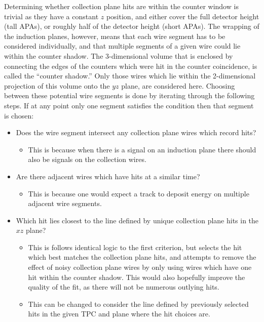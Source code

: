 Determining whether collection plane hits are within the counter window is trivial as they have a constant $z$ position, and either cover the full detector height (tall APAs), or roughly half of the detector height (short APAs). The wrapping of the induction planes, however, means that each wire segment has to be considered individually, and that multiple segments of a given wire could lie within the counter shadow. The 3-dimensional volume that is enclosed by connecting the edges of the counters which were hit in the counter coincidence, is called the ``counter shadow.'' Only those wires which lie within the 2-dimensional projection of this volume onto the $yz$ plane, are considered here. Choosing between these potential wire segments is done by iterating through the following steps. If at any point only one segment satisfies the condition then that segment is chosen:
\begin{itemize}
\item Does the wire segment intersect any collection plane wires which record hits?
  \begin{itemize}
  \item This is because when there is a signal on an induction plane there should also be signals on the collection wires.
  \end{itemize}
\item Are there adjacent wires which have hits at a similar time?
  \begin{itemize}
  \item This is because one would expect a track to deposit energy on multiple adjacent wire segments. 
  \end{itemize}
\item Which hit lies closest to the line defined by unique collection plane hits in the $xz$ plane?
  \begin{itemize}
  \item This is follows identical logic to the first criterion, but selects the hit which best matches the collection plane hits, and attempts to remove the effect of noisy collection plane wires by only using wires which have one hit within the counter shadow. This would also hopefully improve the quality of the fit, as there will not be numerous outlying hits.
  \item This can be changed to consider the line defined by previously selected hits in the given TPC and plane where the hit choices are.
  \end{itemize}
\end{itemize}

